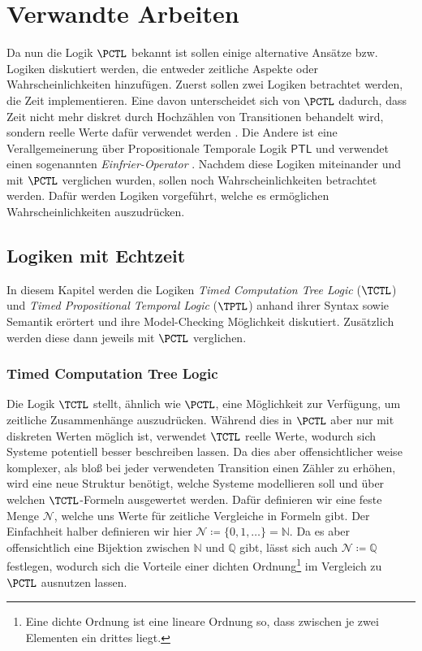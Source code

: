 \section{Verwandte Arbeiten}
\label{ChapVerwandt}

Da nun die Logik $\PCTL$ bekannt ist sollen einige alternative Ansätze bzw. Logiken diskutiert werden, die entweder zeitliche Aspekte oder Wahrscheinlichkeiten hinzufügen.
Zuerst sollen zwei Logiken betrachtet werden, die Zeit implementieren. 
Eine davon unterscheidet sich von $\PCTL$ dadurch, dass Zeit nicht mehr diskret durch Hochzählen von Transitionen behandelt wird, sondern reelle Werte dafür verwendet werden \cite{alur1990model}. 
Die Andere ist eine Verallgemeinerung über Propositionale Temporale Logik $\mathsf{PTL}$ und verwendet einen sogenannten \textit{Einfrier-Operator} \cite{alur1994really}.
Nachdem diese Logiken miteinander und mit $\PCTL$ verglichen wurden, sollen noch Wahrscheinlichkeiten betrachtet werden.
Dafür werden Logiken vorgeführt, welche es ermöglichen Wahrscheinlichkeiten auszudrücken.


\subsection{Logiken mit Echtzeit}

In diesem Kapitel werden die Logiken \textit{Timed Computation Tree Logic} ($\TCTL$) und \textit{Timed Propositional Temporal Logic} ($\TPTL$) anhand ihrer Syntax sowie Semantik erörtert und ihre Model-Checking Möglichkeit diskutiert. 
Zusätzlich werden diese dann jeweils mit $\PCTL$ verglichen.

\subsubsection{Timed Computation Tree Logic}

Die Logik $\TCTL$ stellt, ähnlich wie $\PCTL$, eine Möglichkeit zur Verfügung, um zeitliche Zusammenhänge auszudrücken.
Während dies in $\PCTL$ aber nur mit diskreten Werten möglich ist, verwendet $\TCTL$ reelle Werte, wodurch sich Systeme potentiell besser beschreiben lassen.
Da dies aber offensichtlicher weise komplexer, als bloß bei jeder verwendeten Transition einen Zähler zu erhöhen, wird eine neue Struktur benötigt, welche Systeme modellieren soll und über welchen $\TCTL$-Formeln ausgewertet werden.
Dafür definieren wir eine feste Menge $\mathcal{N}$, welche uns Werte für zeitliche Vergleiche in Formeln gibt.
Der Einfachheit halber definieren wir hier $\mathcal{N}\coloneqq\{0,1,\dots\}=\mathbb{N}$.
Da es aber offensichtlich eine Bijektion zwischen $\mathbb{N}$ und $\mathbb{Q}$ gibt, lässt sich auch $\mathcal{N}\coloneqq\mathbb{Q}$ festlegen, wodurch sich die Vorteile einer dichten Ordnung\footnote{Eine dichte Ordnung ist eine lineare Ordnung so, dass zwischen je zwei Elementen ein drittes liegt.} im Vergleich zu $\PCTL$ ausnutzen lassen. \cite{alur1990model}

